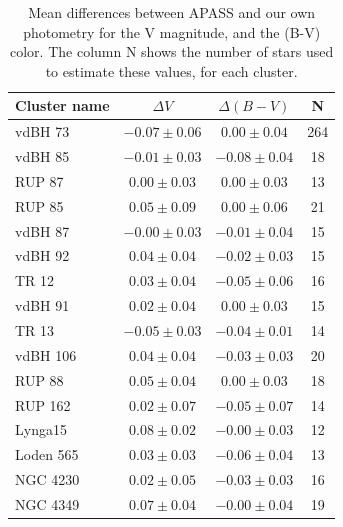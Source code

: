 \documentclass[draft]{aa}
\begin{document}
\begin{table}[ht]
    \centering
    \begin{tabular}{lccc}
    \hline
    Cluster name & $\Delta V$ & $\Delta (B-V)$ & N \\
    \hline \hline
    vdBH 73  &  $-0.07\pm0.06$ &   $0.00\pm0.04$  & 264\\
    vdBH 85  &  $-0.01\pm0.03$  &  $-0.08\pm0.04$  &  18\\
    RUP 87  & $0.00\pm0.03$ &  $0.00\pm0.03$  & 13\\
    RUP 85  & $0.05\pm0.09$  & $0.00\pm0.06$  & 21\\
    vdBH 87 &   $-0.00\pm0.03$ &   $-0.01\pm0.04$ &   15\\
    vdBH 92 &  $0.04\pm0.04$ &  $-0.02\pm0.03$  &  15\\
    TR 12  &  $0.03\pm0.04$  & $-0.05\pm0.06$  &  16\\
    vdBH 91  &  $0.02\pm0.04$ &  $0.00\pm0.03$ &  15\\
    TR 13  &  $-0.05\pm0.03$  &  $-0.04\pm0.01$  &  14\\
    vdBH 106 &  $0.04\pm0.04$ &  $-0.03\pm0.03$  &  20\\
    RUP 88  & $0.05\pm0.04$ &  $0.00\pm0.03$ &  18\\
    RUP 162  &  $0.02\pm0.07$ &  $-0.05\pm0.07$  &  14\\
    Lynga15  &  $0.08\pm0.02$ &  $-0.00\pm0.03$  &  12\\
    Loden 565  &  $0.03\pm0.03$ &  $-0.06\pm0.04$  &  13\\
    NGC 4230 & $0.02\pm0.05$  & $-0.03\pm0.03$  &  16\\
    NGC 4349 &  $0.07\pm0.04$  & $-0.00\pm0.04$ &   19\\
    \hline
    \end{tabular}
    \caption{Mean differences between APASS and our own photometry for the
    V magnitude, and the (B-V) color. The column N shows the number of
    stars used to estimate these values, for each cluster.}
    \label{tab:apass_diffs}
\end{table}
\end{document}
